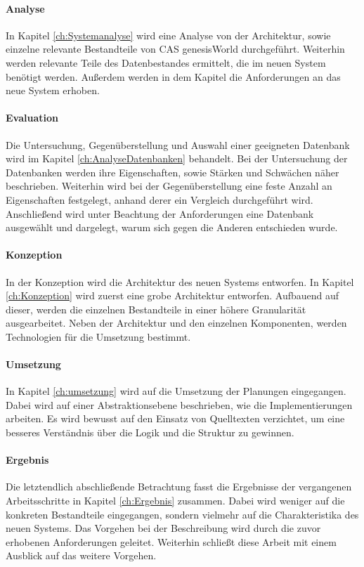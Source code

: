 \paragraph{Analyse} In Kapitel \ref{ch:Systemanalyse} wird eine Analyse von der Architektur, sowie einzelne relevante Bestandteile von CAS genesisWorld durchgeführt. Weiterhin werden relevante Teile des Datenbestandes ermittelt, die im neuen System benötigt werden. Außerdem werden in dem Kapitel die Anforderungen an das neue System erhoben.

\paragraph{Evaluation} Die Untersuchung, Gegenüberstellung und Auswahl einer geeigneten Datenbank wird im Kapitel \ref{ch:AnalyseDatenbanken} behandelt. Bei der Untersuchung der Datenbanken werden ihre Eigenschaften, sowie Stärken und Schwächen näher beschrieben. Weiterhin wird bei der Gegenüberstellung eine feste Anzahl an Eigenschaften festgelegt, anhand derer ein Vergleich durchgeführt wird. Anschließend wird unter Beachtung der Anforderungen eine Datenbank ausgewählt und dargelegt, warum sich gegen die Anderen entschieden wurde.  

\paragraph{Konzeption} In der Konzeption wird die Architektur des neuen Systems entworfen. In Kapitel \ref{ch:Konzeption} wird zuerst eine grobe Architektur entworfen. Aufbauend auf dieser, werden die einzelnen Bestandteile in einer höhere Granularität ausgearbeitet. Neben der Architektur und den einzelnen Komponenten, werden Technologien für die Umsetzung bestimmt. 

\paragraph{Umsetzung} In Kapitel \ref{ch:umsetzung} wird auf die Umsetzung der Planungen eingegangen. Dabei wird auf einer Abstraktionsebene beschrieben, wie die Implementierungen arbeiten. Es wird bewusst auf den Einsatz von Quelltexten verzichtet, um eine besseres Verständnis über die Logik und die Struktur zu gewinnen. 

\paragraph{Ergebnis} Die letztendlich abschließende Betrachtung fasst die Ergebnisse der vergangenen Arbeitsschritte in Kapitel \ref{ch:Ergebnis} zusammen. Dabei wird weniger auf die konkreten Bestandteile eingegangen, sondern vielmehr auf die Charakteristika des neuen Systems. Das Vorgehen bei der Beschreibung wird durch die zuvor erhobenen Anforderungen geleitet. Weiterhin schließt diese Arbeit mit einem Ausblick auf das weitere Vorgehen. 


